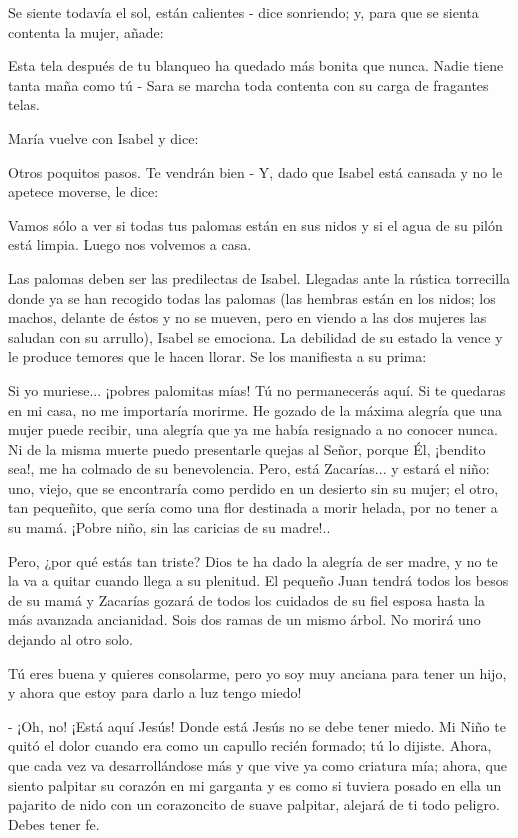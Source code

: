 \documentclass[12pt, twoside, openright]{book} %
\begin{document}
Se siente todavía el sol, están calientes - dice sonriendo; y, para que se sienta contenta la mujer, añade: 

Esta tela después de tu blanqueo ha quedado más bonita que nunca. Nadie tiene tanta maña como tú - Sara se marcha toda contenta con su carga de fragantes telas. 

María vuelve con Isabel y dice: 

Otros poquitos pasos. Te vendrán bien - Y, dado que Isabel está cansada y no le apetece moverse, le dice: 

Vamos sólo a ver si todas tus palomas están en sus nidos y si el agua de su pilón está limpia. Luego nos volvemos a casa. 

Las palomas deben ser las predilectas de Isabel. Llegadas ante la rústica torrecilla donde ya se han recogido todas las palomas (las hembras están en los nidos; los machos, delante de éstos y no se mueven, pero en viendo a las dos mujeres las saludan con su arrullo), Isabel se emociona. La debilidad de su estado la vence y le produce temores que le hacen llorar. Se los manifiesta a su prima: 

Si yo muriese... ¡pobres palomitas mías! Tú no permanecerás aquí. Si te quedaras en mi casa, no me importaría morirme. He gozado de la máxima alegría que una mujer puede recibir, una alegría que ya me había resignado a no conocer nunca. Ni de la misma muerte puedo presentarle quejas al Señor, porque Él, ¡bendito sea!, me ha colmado de su benevolencia. Pero, está Zacarías... y estará el niño: uno, viejo, que se encontraría como perdido en un desierto sin su mujer; el otro, tan pequeñito, que sería como una flor destinada a morir helada, por no tener a su mamá. ¡Pobre niño, sin las caricias de su madre!.. 

Pero, ¿por qué estás tan triste? Dios te ha dado la alegría de ser madre, y no te la va a quitar cuando llega a su plenitud. El pequeño Juan tendrá todos los besos de su mamá y Zacarías gozará de todos los cuidados de su fiel esposa hasta la más avanzada ancianidad. Sois dos ramas de un mismo árbol. No morirá uno dejando al otro solo. 

Tú eres buena y quieres consolarme, pero yo soy muy anciana para tener un hijo, y ahora que estoy para darlo a luz tengo miedo! 

- ¡Oh, no! ¡Está aquí Jesús! Donde está Jesús no se debe tener miedo. Mi Niño te quitó el dolor cuando era como un capullo recién formado; tú lo dijiste. Ahora, que cada vez va desarrollándose más y que vive ya como criatura mía; ahora, que siento palpitar su corazón en mi garganta y es como si tuviera posado en ella un pajarito de nido con un corazoncito de suave palpitar, alejará de ti todo peligro. Debes tener fe. 
\end{document}
